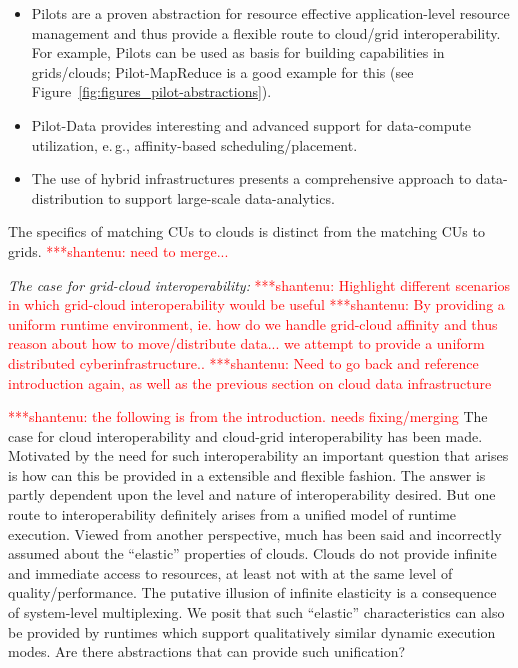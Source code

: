 \documentclass[times]{cpeauth}
\newcommand{\jhanote}[1]{ {\textcolor{red} { ***shantenu: #1 }}}
\newcommand{\jhanote}[1]{}
\newcommand{\pilots}{Pilots\xspace}
\newcommand{\pilotdata}{Pilot-Data\xspace}
\newcommand{\cus}{CUs\xspace}
\begin{document}
\begin{itemize}
\item \pilots are a proven abstraction for resource effective
  application-level resource management and thus provide a flexible
  route to cloud/grid interoperability. For example, \pilots can be used as 
  basis for building capabilities in grids/clouds; Pilot-MapReduce is a good 
  example for this (see Figure~\ref{fig:figures_pilot-abstractions}).
\item \pilotdata provides interesting and advanced support for
  data-compute utilization, e.\,g., affinity-based scheduling/placement.
\item The use of hybrid infrastructures presents a comprehensive
  approach to data-distribution to support large-scale data-analytics.
\end{itemize}


The specifics of matching \cus to clouds is distinct from the matching
\cus to grids.\jhanote{need to merge...}

{\it The case for grid-cloud interoperability:} \jhanote{Highlight
  different scenarios in which grid-cloud interoperability would be
  useful} \jhanote{By providing a uniform runtime environment, ie.
  how do we handle grid-cloud affinity and thus reason about how to
  move/distribute data... we attempt to provide a uniform distributed
  cyberinfrastructure..} \jhanote{Need to go back and reference
  introduction again, as well as the previous section on cloud data
  infrastructure}

\jhanote{the following is from the introduction. needs fixing/merging}
The case for cloud interoperability and cloud-grid interoperability
has been made. Motivated by the need for such interoperability an
important question that arises is how can this be provided in a
extensible and flexible fashion. The answer is partly dependent upon
the level and nature of interoperability desired. But one route to
interoperability definitely arises from a unified model of runtime
execution.  Viewed from another perspective, much has been said and
incorrectly assumed about the ``elastic'' properties of clouds. Clouds
do not provide infinite and immediate access to resources, at least
not with at the same level of quality/performance. The putative
illusion of infinite elasticity is a consequence of system-level
multiplexing.  We posit that such ``elastic'' characteristics can also
be provided by runtimes which support qualitatively similar dynamic
execution modes.  Are there abstractions that can provide such
unification?
\end{document}

